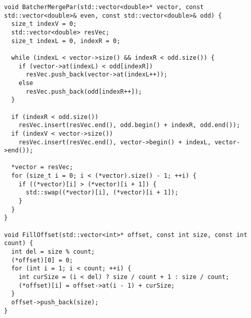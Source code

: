 \documentclass{report}
\begin{document}
\begin{lstlisting}
void BatcherMergePar(std::vector<double>* vector, const std::vector<double>& even, const std::vector<double>& odd) {
  size_t indexV = 0;
  std::vector<double> resVec;
  size_t indexL = 0, indexR = 0;

  while (indexL < vector->size() && indexR < odd.size()) {
    if (vector->at(indexL) < odd[indexR])
      resVec.push_back(vector->at(indexL++));
    else
      resVec.push_back(odd[indexR++]);
  }

  if (indexR < odd.size())
    resVec.insert(resVec.end(), odd.begin() + indexR, odd.end());
  if (indexV < vector->size())
    resVec.insert(resVec.end(), vector->begin() + indexL, vector->end());

  *vector = resVec;
  for (size_t i = 0; i < (*vector).size() - 1; ++i) {
    if ((*vector)[i] > (*vector)[i + 1]) {
      std::swap((*vector)[i], (*vector)[i + 1]);
    }
  }
}

void FillOffset(std::vector<int>* offset, const int size, const int count) {
  int del = size % count;
  (*offset)[0] = 0;
  for (int i = 1; i < count; ++i) {
    int curSize = (i < del) ? size / count + 1 : size / count;
    (*offset)[i] = offset->at(i - 1) + curSize;
  }
  offset->push_back(size);
}
\end{lstlisting}
\end{document}
